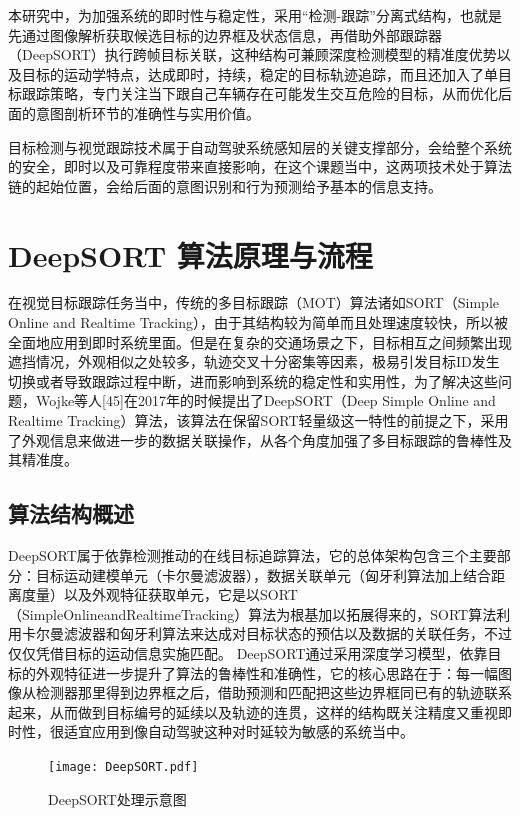 本研究中，为加强系统的即时性与稳定性，采用“检测-跟踪”分离式结构，也就是先通过图像解析获取候选目标的边界框及状态信息，再借助外部跟踪器（DeepSORT）执行跨帧目标关联，这种结构可兼顾深度检测模型的精准度优势以及目标的运动学特点，达成即时，持续，稳定的目标轨迹追踪，而且还加入了单目标跟踪策略，专门关注当下跟自己车辆存在可能发生交互危险的目标，从而优化后面的意图剖析环节的准确性与实用价值。

目标检测与视觉跟踪技术属于自动驾驶系统感知层的关键支撑部分，会给整个系统的安全，即时以及可靠程度带来直接影响，在这个课题当中，这两项技术处于算法链的起始位置，会给后面的意图识别和行为预测给予基本的信息支持。

\section{DeepSORT 算法原理与流程}

在视觉目标跟踪任务当中，传统的多目标跟踪（MOT）算法诸如SORT（Simple Online and Realtime Tracking），由于其结构较为简单而且处理速度较快，所以被全面地应用到即时系统里面。但是在复杂的交通场景之下，目标相互之间频繁出现遮挡情况，外观相似之处较多，轨迹交叉十分密集等因素，极易引发目标ID发生切换或者导致跟踪过程中断，进而影响到系统的稳定性和实用性，为了解决这些问题，Wojke等人[45]在2017年的时候提出了DeepSORT（Deep Simple Online and Realtime Tracking）算法，该算法在保留SORT轻量级这一特性的前提之下，采用了外观信息来做进一步的数据关联操作，从各个角度加强了多目标跟踪的鲁棒性及其精准度。

\subsection{算法结构概述}

DeepSORT属于依靠检测推动的在线目标追踪算法，它的总体架构包含三个主要部分：目标运动建模单元（卡尔曼滤波器），数据关联单元（匈牙利算法加上结合距离度量）以及外观特征获取单元，它是以SORT（SimpleOnlineandRealtimeTracking）算法为根基加以拓展得来的，SORT算法利用卡尔曼滤波器和匈牙利算法来达成对目标状态的预估以及数据的关联任务，不过仅仅凭借目标的运动信息实施匹配。 DeepSORT通过采用深度学习模型，依靠目标的外观特征进一步提升了算法的鲁棒性和准确性，它的核心思路在于：每一幅图像从检测器那里得到边界框之后，借助预测和匹配把这些边界框同已有的轨迹联系起来，从而做到目标编号的延续以及轨迹的连贯，这样的结构既关注精度又重视即时性，很适宜应用到像自动驾驶这种对时延较为敏感的系统当中。

\begin{figure}[H]
	\centering
	\texttt{[image: DeepSORT.pdf]}  %
	\caption{DeepSORT处理示意图}
	\label{fig:example_image}  %
\end{figure}


